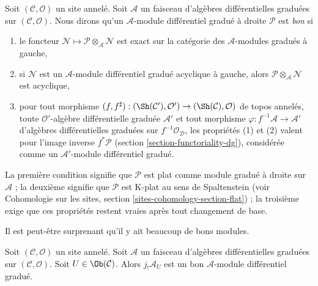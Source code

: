 \medskip\noindent
Soit $(\mathcal{C}, \mathcal{O})$ un site annelé.
Soit $\mathcal{A}$ un faisceau d'algèbres différentielles graduées sur $(\mathcal{C}, \mathcal{O})$.
Nous dirons qu'un $\mathcal{A}$-module différentiel gradué à droite $\mathcal{P}$ est {\it bon} si
\begin{enumerate}
\item le foncteur $\mathcal{N} \mapsto \mathcal{P} \otimes_\mathcal{A} \mathcal{N}$ est exact sur la catégorie des $\mathcal{A}$-modules gradués à gauche,
\item si $\mathcal{N}$ est un $\mathcal{A}$-module différentiel gradué acyclique à gauche, alors $\mathcal{P} \otimes_\mathcal{A} \mathcal{N}$ est acyclique,
\item pour tout morphisme $(f, f^\sharp) : (\Sh(\mathcal{C}'), \mathcal{O}') \to (\Sh(\mathcal{C}), \mathcal{O})$ de topos annelés, toute $\mathcal{O}'$-algèbre différentielle graduée $\mathcal{A}'$ et tout morphisme $\varphi : f^{-1}\mathcal{A} \to \mathcal{A}'$ d'algèbres différentielles graduées sur $f^{-1}\mathcal{O}_\mathcal{D}$, les propriétés (1) et (2) valent pour l'image inverse $f^*\mathcal{P}$ (section \ref{section-functoriality-dg}), considérée comme un $\mathcal{A}'$-module différentiel gradué.
\end{enumerate}
La première condition signifie que $\mathcal{P}$ est plat comme module gradué à droite sur $\mathcal{A}$ ; la deuxième signifie que $\mathcal{P}$ est K-plat au sens de Spaltenstein (voir Cohomologie sur les sites, section \ref{sites-cohomology-section-flat}) ; la troisième exige que ces propriétés restent vraies après tout changement de base.

\medskip\noindent
Il est peut-être surprenant qu'il y ait beaucoup de bons modules.

\begin{lemma}
\label{lemma-supply-good}
Soit $(\mathcal{C}, \mathcal{O})$ un site annelé.
Soit $\mathcal{A}$ un faisceau d'algèbres différentielles graduées sur $(\mathcal{C}, \mathcal{O})$.
Soit $U \in \Ob(\mathcal{C})$.
Alors $j_!\mathcal{A}_U$ est un bon $\mathcal{A}$-module différentiel gradué.
\end{lemma}

